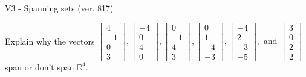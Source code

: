 \begin{exercise}
  \begin{exerciseTitle}V3 - Spanning sets (ver. 817)\end{exerciseTitle}
  \begin{exerciseStatement}
    Explain why the vectors \(\left[\begin{array}{r}
4 \\
-1 \\
0 \\
3
\end{array}\right] , \left[\begin{array}{r}
-4 \\
0 \\
4 \\
0
\end{array}\right] , \left[\begin{array}{r}
0 \\
-1 \\
4 \\
3
\end{array}\right] , \left[\begin{array}{r}
0 \\
1 \\
-4 \\
-3
\end{array}\right] , \left[\begin{array}{r}
-4 \\
2 \\
-3 \\
-5
\end{array}\right] , \text{ and } \left[\begin{array}{r}
3 \\
0 \\
2 \\
2
\end{array}\right]\) span or don't span \(\mathbb{R}^4\). 
	



\end{exerciseStatement}
\end{exercise}
